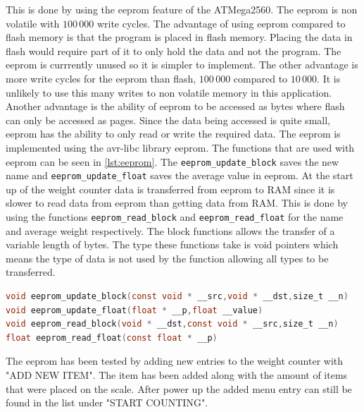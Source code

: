 This is done by using the eeprom feature of the ATMega2560. The eeprom is non volatile with $100\,000$ write cycles. The advantage of using eeprom compared to flash memory is that the program is placed in flash memory. Placing the data in flash would require part of it to only hold the data and not the program. The eeprom is currrently unused so it is simpler to implement. The other advantage is more write cycles for the eeprom than flash, $100\,000$ compared to $10\,000$. It is unlikely to use this many writes to non volatile memory in this application. Another advantage is the ability of eeprom to be accessed as bytes where flash can only be accessed as pages. Since the data being accessed is quite small, eeprom has the ability to only read or write the required data. The eeprom is implemented using the avr-libc library eeprom. \cite{EEPROM} The functions that are used with eeprom can be seen in \cref{lst:eeprom}. The \texttt{eeprom_update_block} saves the new name and \texttt{eeprom_update_float} saves the average value in eeprom. At the start up of the weight counter data is transferred from eeprom to RAM since it is slower to read data from eeprom than getting data from RAM. This is done by using the functions \texttt{eeprom_read_block} and \texttt{eeprom_read_float} for the name and average weight respectively. The block functions allows the transfer of a variable length of bytes. The type these functions take is void pointers which means the type of data is not used by the function allowing all types to be transferred.
\vspace{-10pt}
\begin{lstlisting}[caption={EEPROM functions.}, label={lst:eeprom}, language=C, directivestyle={\color{black}},
emph={int,char,double,float,unsigned},emphstyle={\color{blue}}]
void eeprom_update_block(const void * __src,void * __dst,size_t __n)
void eeprom_update_float(float * __p,float __value)
void eeprom_read_block(void * __dst,const void * __src,size_t __n)
float eeprom_read_float(const float * __p)
\end{lstlisting}
\vspace{10pt}

The eeprom has been tested by adding new entries to the weight counter with "ADD NEW ITEM". The item has been added along with the amount of items that were placed on the scale. After power up the added menu entry can still be found in the list under "START COUNTING".